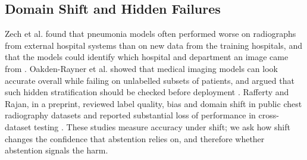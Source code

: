 \subsection{Domain Shift and Hidden Failures}
Zech et al. found that pneumonia models often performed worse on radiographs from external hospital systems than on new data from the training hospitals, and that the models could identify which hospital and department an image came from \cite{zech2018}. Oakden-Rayner et al. showed that medical imaging models can look accurate overall while failing on unlabelled subsets of patients, and argued that such hidden stratification should be checked before deployment \cite{oakdenrayner2020}. Rafferty and Rajan, in a preprint, reviewed label quality, bias and domain shift in public chest radiography datasets and reported substantial loss of performance in cross-dataset testing \cite{rafferty2025}. These studies measure accuracy under shift; we ask how shift changes the confidence that abstention relies on, and therefore whether abstention signals the harm.
